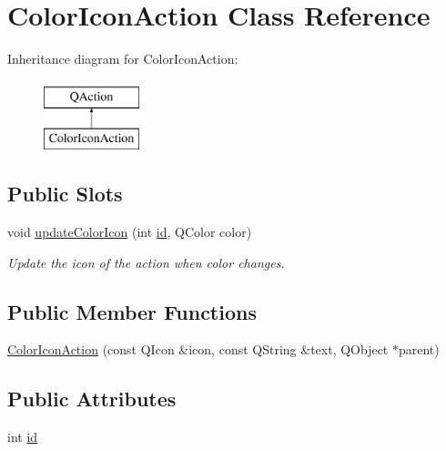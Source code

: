 \hypertarget{class_color_icon_action}{\section{Color\-Icon\-Action Class Reference}
\label{class_color_icon_action}
}
Inheritance diagram for Color\-Icon\-Action\-:\begin{figure}[H]
\begin{center}
\leavevmode
\includegraphics[height=2.000000cm]{class_color_icon_action}
\end{center}
\end{figure}
\subsection*{Public Slots}
\begin{DoxyCompactItemize}
\item 
void \hyperlink{class_color_icon_action_ae1e19112ea77d9b530119ca8f5b9df1b}{update\-Color\-Icon} (int \hyperlink{class_color_icon_action_a11d799bf0358f7a23d4dcf6260612d5c}{id}, Q\-Color color)
\begin{DoxyCompactList}\small\item\em Update the icon of the action when color changes. \end{DoxyCompactList}\end{DoxyCompactItemize}
\subsection*{Public Member Functions}
\begin{DoxyCompactItemize}
\item 
\hyperlink{class_color_icon_action_aabc8d51f340cf2681ada53e6533484fb}{Color\-Icon\-Action} (const Q\-Icon \&icon, const Q\-String \&text, Q\-Object $\ast$parent)
\end{DoxyCompactItemize}
\subsection*{Public Attributes}
\begin{DoxyCompactItemize}
\item 
int \hyperlink{class_color_icon_action_a11d799bf0358f7a23d4dcf6260612d5c}{id}
\end{DoxyCompactItemize}
